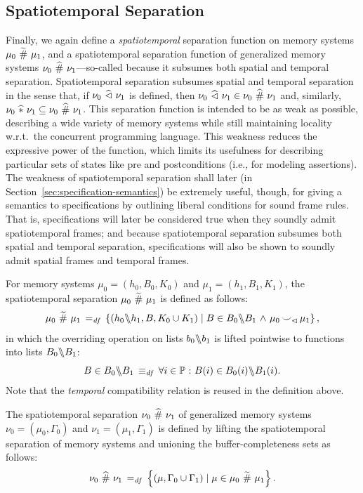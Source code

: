 \documentclass[11pt]{report}
\begin{document}
\subsection{Spatiotemporal Separation}
\label{sec:spatiotemporal-separation}

Finally, we again define a \emph{spatiotemporal} separation function on memory systems $\mu_0 \operatorname{\,\widetilde{\#}\,} \mu_1$, and a spatiotemporal separation function of generalized memory systems $\nu_0 \operatorname{\,\widehat{\#}\,} \nu_1$---so-called because it subsumes both spatial and temporal separation. Spatiotemporal separation subsumes spatial and temporal separation in the sense that, if $\nu_0 \operatorname{\,\widehat{\vartriangleleft}\,} \nu_1$ is defined, then $\nu_0 \operatorname{\,\widehat{\vartriangleleft}\,} \nu_1 \in \nu_0 \operatorname{\,\widehat{\#}\,} \nu_1$ and, similarly, $\nu_0 \operatorname{\,\widehat{\ast}\,} \nu_1 \subseteq \nu_0 \operatorname{\,\widehat{\#}\,} \nu_1$. This separation function is intended to be as weak as possible, describing a wide variety of memory systems while still maintaining locality w.r.t.\ the concurrent programming language. This weakness reduces the expressive power of the function, which limits its usefulness for describing particular sets of states like pre and postconditions (i.e., for modeling assertions). The weakness of spatiotemporal separation shall later (in Section~\ref{sec:specification-semantics}) be extremely useful, though, for giving a semantics to specifications by outlining liberal conditions for sound frame rules. That is, specifications will later be considered true when they soundly admit spatiotemporal frames; and because spatiotemporal separation subsumes both spatial and temporal separation, specifications will also be shown to soundly admit spatial frames and temporal frames. 

For memory systems $\mu_0 = (h_0,B_0,K_0)$ and $\mu_1 = (h_1,B_1,K_1)$, the spatiotemporal separation $\mu_0 \operatorname{\,\widetilde{\#}\,} \mu_1$ is defined as follows: \[ \mu_0 \operatorname{\,\widetilde{\#}\,} \mu_1 \operatorname{\;=_{\mathit{df}}\;} \left\lbrace (h_0 \backslash\!\!\backslash h_1, B, K_0 \cup K_1) \mid B \in B_0 \backslash\!\!\backslash B_1 \operatorname{\,\wedge\,} \mu_0 \operatorname{\smile}_\vartriangleleft \mu_1 \right\rbrace,\] in which the overriding operation on lists $b_0 \backslash\!\!\backslash b_1$ is lifted pointwise to functions into lists $B_0 \backslash\!\!\backslash B_1$: \[ B \in B_0 \backslash\!\!\backslash B_1 \operatorname{\;\equiv_{\mathit{df}}\;} \forall i \in \mathbb{P} \operatorname{\,:\,} B(i) \in B_0(i) \backslash\!\!\backslash B_1(i).\] Note that the \emph{temporal} compatibility relation is reused in the definition above. 

The spatiotemporal separation $\nu_0 \operatorname{\,\widehat{\#}\,} \nu_1$ of generalized memory systems $\nu_0 = (\mu_0,\Gamma_0)$ and $\nu_1 = (\mu_1,\Gamma_1)$ is defined by lifting the spatiotemporal separation of memory systems and unioning the buffer-completeness sets as follows: \[ \nu_0 \operatorname{\,\widehat{\#}\,} \nu_1 \operatorname{\;=_{\mathit{df}}\;} \left\lbrace (\mu,\Gamma_0 \cup \Gamma_1) \mid \mu \in \mu_0 \operatorname{\,\widetilde{\#}\,} \mu_1 \right\rbrace.\]
\end{document}
